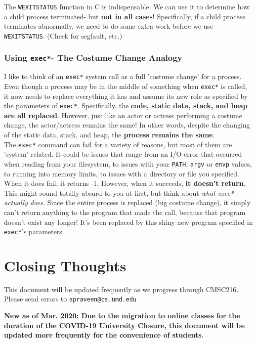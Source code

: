 \documentclass[english, 10pt]{article}
\begin{document}
The \texttt{WEXITSTATUS} function in C is indispensable. We can use it to determine how a child process terminated- but \textbf{not in all cases}! Specifically, if a child process terminates abnormally, we need to do some extra work before we use \texttt{WEXITSTATUS}. (Check for segfault, etc.)

\subsubsection{Using \texttt{exec*}- The Costume Change Analogy}

I like to think of an \texttt{exec*} system call as a full 'costume change' for a process. Even though a process may be in the middle of something when \texttt{exec*} is called, it now needs to replace everything it has and assume its new role as specified by the parameters of \texttt{exec*}. Specifically, the \textbf{code, static data, stack, and heap are all replaced}. However, just like an actor or actress performing a costume change, the actor/actress remains the same! In other words, despite the changing of the static data, stack, and heap, the \textbf{process remains the same}.\\

The \texttt{exec*} command can fail for a variety of reasons, but most of them are 'system' related. It could be issues that range from an I/O error that occurred when reading from your filesystem, to issues with your \texttt{PATH}, \texttt{argv} or \texttt{envp} values, to running into memory limits, to issues with a directory or file you specified.\\

When it does fail, it returns -1. However, when it succeeds, \textbf{it doesn't return}. This might sound totally absurd to you at first, but think about \textit{what exec* actually does.} Since the entire process is replaced (big costume change), it simply can't return anything to the program that made the call, because that program doesn't exist any longer! It's been replaced by this shiny new program specified in \texttt{exec*}'s parameters.

\section{Closing Thoughts}

This document will be updated frequently as we progress through CMSC216. Please send errors to \texttt{apraveen@cs.umd.edu}\newline

\textbf{New as of Mar. 2020: Due to the migration to online classes for the duration of the COVID-19 University Closure, this document will be updated more frequently for the convenience of students.}
\end{document}
